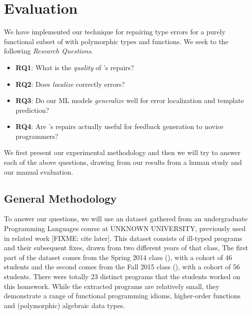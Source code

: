 \section{Evaluation}
\label{sec:eval}

We have implemented our technique for repairing type errors for a purely
functional subset of \ocaml with polymorphic types and functions. We seek to the
following \emph{Research Questions}.

\begin{itemize}
    \item \textbf{RQ1}: What is the \emph{quality} of \toolname's repairs?
    \item \textbf{RQ2}: Does \toolname \emph{localize} correctly errors?
    \item \textbf{RQ3}: Do our ML models \emph{generalize} well for error
    localization and template prediction?
    \item \textbf{RQ4}: Are \toolname's repairs actually useful for feedback
    generation to novice programmers?
\end{itemize}

We first present our experimental methodology and then we will try to answer
each of the above questions, drawing from our results from a human study and our
manual evaluation.


\subsection{General Methodology}
\label{subsec:gen_method}
To answer our questions, we will use an \ocaml dataset gathered from an
undergraduate Programming Languages course at UNKNOWN UNIVERSITY, previously
used in related work [FIXME: cite later]. This dataset consists of ill-typed
programs and their subsequent fixes, drawn from two different years of that
class, The first part of the dataset comes from the Spring 2014 class (\SPRING),
with a cohort of 46 students and the second comes from the Fall 2015 class
(\FALL), with a cohort of 56 students. There were totally 23 distinct programs
that the students worked on this homework. While the extracted programs are
relatively small, they demonstrate a range of functional programming idioms, \eg
higher-order functions and (polymorphic) algebraic data types.

